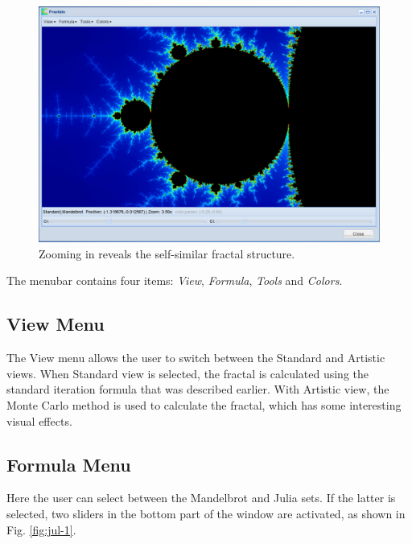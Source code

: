 \documentclass{article}
\begin{document}
\begin{figure}[!ht]
\begin{center}
\includegraphics[width=\textwidth]{img/mandelbrot-2.png}
\end{center}
\caption{Zooming in reveals the self-similar fractal structure.}
\label{fig:man-2}
\end{figure}

\noindent
The menubar contains four items: {\em View}, {\em Formula}, {\em Tools} and {\em Colors}.

\subsection{View Menu}
The View menu allows the user to switch between the Standard and Artistic views. When Standard view
is selected, the fractal is calculated using the standard iteration formula that was described earlier. 
With Artistic view, the Monte Carlo method is used to calculate the fractal, which has some 
interesting visual effects.

\subsection{Formula Menu}

Here the user can select between the Mandelbrot and Julia sets. If the latter is selected, two
sliders in the bottom part of the window are activated, as shown in 
Fig. \ref{fig:jul-1}.

\clearpage
\end{document}
